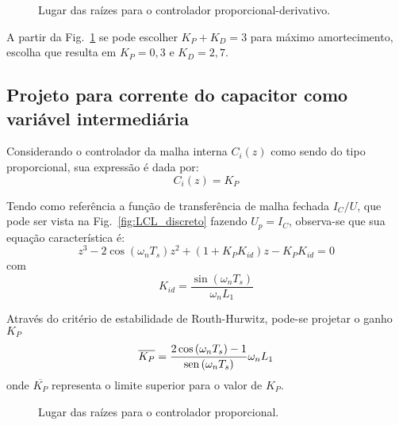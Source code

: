   \begin{figure}[htb]
    \renewcommand\figurename{Fig.}
    \caption{Lugar das raízes para o controlador proporcional-derivativo.}
    \label{fig:rlocus_vc_2}
  \end{figure}

  A partir da Fig.~\ref{fig:rlocus_vc_2} se pode escolher $K_P+K_D = 3$ para máximo amortecimento, escolha que resulta em $K_P = 0,3$ e $K_D = 2,7$.


\subsection{Projeto para corrente do capacitor como variável intermediária}

  Considerando o controlador da malha interna $C_i(z)$ como sendo do tipo proporcional, sua expressão é dada por:
  \begin{equation}
    C_i(z) = K_P
  \end{equation}

  Tendo como referência a função de transferência de malha fechada $I_C/U$, que pode ser vista na Fig.~\ref{fig:LCL_discreto} fazendo $U_p = I_C$, observa-se que sua equação característica é:
  \begin{equation}
    z^3 - 2 \cos \left( \omega_n T_s \right) z^2 + \left( 1 + K_P K_{id} \right) z - K_P K_{id} = 0
  \end{equation}
  com
  \begin{equation}
    K_{id} = \frac{\sin(\omega_n T_s)}{\omega_n L_1}
  \end{equation}

  Através do critério de estabilidade de Routh-Hurwitz, pode-se projetar o ganho $K_P$
  \begin{equation}
    \overline{K_P} = \frac{2 \cos \left( \omega_n T_s \right) - 1}
      {\operatorname{sen} \left( \omega_n T_s \right)} \omega_n L_1
  \end{equation}
  onde $\overline{K_P}$ representa o limite superior para o valor de $K_P$.

  \begin{figure}[htb]
    \centering{
      \def\svgwidth{\textwidth}
      }
    \renewcommand\figurename{Fig.}
    \caption{Lugar das raízes para o controlador proporcional.}
    \label{fig:rlocus_ic_2}
  \end{figure}

